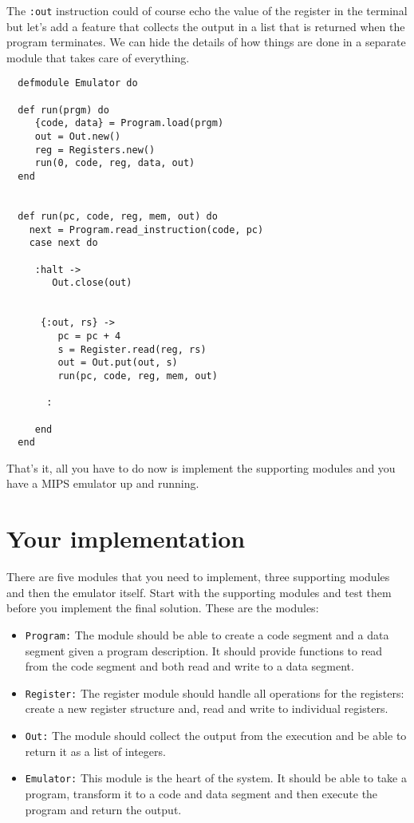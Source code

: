 \documentclass[a4paper,11pt]{article}
\begin{document}
The {\tt :out} instruction could of course echo the value of the
register in the terminal but let's add a feature that collects the
output in a list that is returned when the program terminates. We can
hide the details of how things are done in a separate module that
takes care of everything.


\begin{verbatim}
  defmodule Emulator do

  def run(prgm) do
     {code, data} = Program.load(prgm)
     out = Out.new()
     reg = Registers.new() 
     run(0, code, reg, data, out)
  end


  def run(pc, code, reg, mem, out) do
    next = Program.read_instruction(code, pc)
    case next do
 
     :halt ->
        Out.close(out)
    

      {:out, rs} ->
         pc = pc + 4
         s = Register.read(reg, rs)
         out = Out.put(out, s)
         run(pc, code, reg, mem, out)          

       :

     end
  end
\end{verbatim}

 That's it, all you have to do now is implement the supporting modules and you have a MIPS emulator up and running.

 \section{Your implementation}

 There are five modules that you need to implement, three supporting
 modules and then the emulator itself. Start with the supporting
 modules and test them before you implement the final solution. These
 are the modules:

 \begin{itemize}
  \item{\tt Program:} The module should be able to create a code
   segment and a data segment given a program description. It should
   provide functions to read from the code segment and both read and
   write to a data segment.

  \item{\tt Register:} The register module should handle all operations for
   the registers: create a new register structure and, read and write to
   individual registers.

 \item{\tt Out:} The module should collect the output from the
   execution and be able to return it as a list of integers. 

 \item{\tt Emulator:} This module is the heart of the system. It
   should be able to take a program, transform it to a code and data
   segment and then execute the program and return the output.
 \end{itemize}
\end{document}
